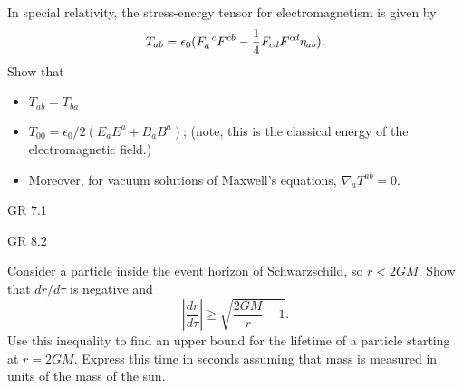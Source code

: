 \documentclass[minion]{homework}
\begin{document}
\begin{aproblems}

\hproblem In special relativity, the stress-energy tensor for electromagnetism
is given by
\[
T_{ab} = \epsilon_0( F\indices{_a^c}F^{cb} - \frac{1}{4} F_{cd}F^{cd}\eta_{ab}).
\]
Show that
\begin{itemize}
\item $T_{ab}=T_{ba}$
\item $T_{00}=\epsilon_0/2(E_aE^a +B_aB^a)$; (note, this is the classical energy of the 
electromagnetic field.)
\item Moreover, for vacuum solutions of Maxwell's equations, $\nabla_a T^{ab} = 0$.
\end{itemize}

\hproblem GR 7.1

\hproblem GR 8.2

\hproblem Consider a particle inside the event horizon of Schwarzschild, so $r<2GM$.  Show that
$dr/d\tau$ is negative and
\[
\left| \frac{dr}{d\tau} \right|  \ge \sqrt{\frac{2GM}{r}-1}.
\]
Use this inequality to find an upper bound for the lifetime of a particle starting at $r=2GM$.
Express this time in seconds assuming that mass is measured in units of the mass of the sun.

\end{aproblems}
\end{document}

